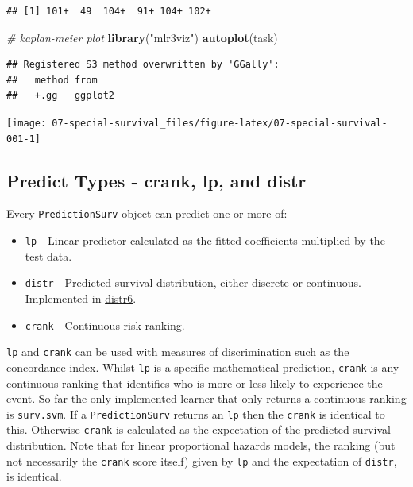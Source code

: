 \documentclass[]{scrbook}
\newenvironment{Shaded}{\begin{snugshade}}{\end{snugshade}}
\newcommand{\CommentTok}[1]{\textcolor[rgb]{0.56,0.35,0.01}{\textit{#1}}}
\newcommand{\KeywordTok}[1]{\textcolor[rgb]{0.13,0.29,0.53}{\textbf{#1}}}
\newcommand{\NormalTok}[1]{#1}
\newcommand{\OperatorTok}[1]{\textcolor[rgb]{0.81,0.36,0.00}{\textbf{#1}}}
\newcommand{\StringTok}[1]{\textcolor[rgb]{0.31,0.60,0.02}{#1}}
\providecommand{\tightlist}{%
  \setlength{\itemsep}{0pt}\setlength{\parskip}{0pt}}
\renewenvironment{Shaded} {\begin{snugshade}\small} {\end{snugshade}}
\begin{document}
\begin{Shaded}
\end{Shaded}

\begin{verbatim}
## [1] 101+  49  104+  91+ 104+ 102+
\end{verbatim}

\begin{Shaded}
\begin{Highlighting}[]
\CommentTok{# kaplan-meier plot}
\KeywordTok{library}\NormalTok{(}\StringTok{"mlr3viz"}\NormalTok{)}
\KeywordTok{autoplot}\NormalTok{(task)}
\end{Highlighting}
\end{Shaded}

\begin{verbatim}
## Registered S3 method overwritten by 'GGally':
##   method from   
##   +.gg   ggplot2
\end{verbatim}

\begin{center}\texttt{[image: 07-special-survival\_files/figure-latex/07-special-survival-001-1]} \end{center}

\hypertarget{predict-types---crank-lp-and-distr}{%
\subsection{Predict Types - crank, lp, and distr}\label{predict-types---crank-lp-and-distr}}

Every \texttt{PredictionSurv} object can predict one or more of:

\begin{itemize}
\tightlist
\item
  \texttt{lp} - Linear predictor calculated as the fitted coefficients multiplied by the test data.
\item
  \texttt{distr} - Predicted survival distribution, either discrete or continuous. Implemented in \href{https://cran.r-project.org/package=distr6}{distr6}.
\item
  \texttt{crank} - Continuous risk ranking.
\end{itemize}

\texttt{lp} and \texttt{crank} can be used with measures of discrimination such as the concordance index.
Whilst \texttt{lp} is a specific mathematical prediction, \texttt{crank} is any continuous ranking that identifies who is more or less likely to experience the event.
So far the only implemented learner that only returns a continuous ranking is \texttt{surv.svm}.
If a \texttt{PredictionSurv} returns an \texttt{lp} then the \texttt{crank} is identical to this.
Otherwise \texttt{crank} is calculated as the expectation of the predicted survival distribution.
Note that for linear proportional hazards models, the ranking (but not necessarily the \texttt{crank} score itself) given by \texttt{lp} and the expectation of \texttt{distr}, is identical.
\end{document}
